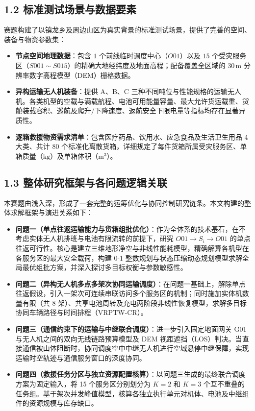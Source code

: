 \documentclass[12pt,a4paper,UTF8]{ctexart}
\begin{document}
\subsection{1.2 标准测试场景与数据要素}
赛题构建了以镇龙乡及周边山区为真实背景的标准测试场景，提供了完善的空间、装备与物资参数集：
\begin{itemize}[leftmargin=*]
    \item \textbf{节点空间地理数据}：包含 $1$ 个前线临时调度中心（$O01$）以及 $15$ 个受灾服务区（$S001\sim S015$）的精确大地经纬度及地面高程；配备覆盖全区域的 $30\,\text{m}$ 分辨率数字高程模型（DEM）栅格数据。
    \item \textbf{异构运输无人机装备}：提供 A、B、C 三种不同吨位与性能规格的运输无人机。各类机型的空载与满载航程、电池可用能量容量、最大允许货运载重、货舱装载容积、巡航及爬升/下降速度、返航安全下限电量等指标均存在显著异质性。
    \item \textbf{逐箱救援物资需求清单}：包含医疗药品、饮用水、应急食品及生活卫生用品 4 大类、共计 $80$ 个标准化离散货箱，详细规定了每件货箱所属受灾服务区、单箱质量（$\text{kg}$）及单箱体积（$\text{m}^3$）。
\end{itemize}

\subsection{1.3 整体研究框架与各问题逻辑关联}
本赛题由浅入深，形成了一套完整的运筹优化与协同控制研究链条。本文构建的整体求解框架与演进关系如下：
\begin{itemize}[leftmargin=*]
    \item \textbf{问题一（单点往返运输能力与货箱组批优化）}：作为全体系的技术基石，在不考虑实体无人机排班与电池有限流转的前提下，研究 $O01 \to S_i \to O01$ 的单点往返可行性。核心是建立三维地形净空与非线性能耗模型，精确解算各机型在各服务区的最大安全载荷，构建 0-1 整数规划与状态压缩动态规划模型求解全局最优组批方案，并深入探讨多目标权衡与参数敏感性。
    \item \textbf{问题二（异构无人机多点多架次协同运输调度）}：在问题一基础上，解除单点往返假设，引入一架次可连续串联访问多个服务区的机制；同时施加实体机数量有限（共 8 架）、共享电池周转及充电两阶段非线性恢复模型，求解多目标协同车辆路径与时间排程（VRPTW-CR）。
    \item \textbf{问题三（通信约束下的运输与中继联合调度）}：进一步引入固定地面网关 G01 与无人机之间的双向无线链路预算模型及 DEM 视距遮挡（LOS）判决。当直接通信被山体阻断时，协同调度空中中继无人机进行空域悬停中继保障，实现运输时空轨迹与通信服务窗口的深度协同。
    \item \textbf{问题四（救援任务分区与独立资源配置核算）}：以问题三生成的最终联合调度方案为固定输入，将 15 个服务区分别划分为 $K=2$ 和 $K=3$ 个互不重叠的任务组。基于架次并发峰值模型，核算各独立执行单元对机体、电池及中继组件的资源规模与库存缺口。
\end{itemize}
\end{document}
